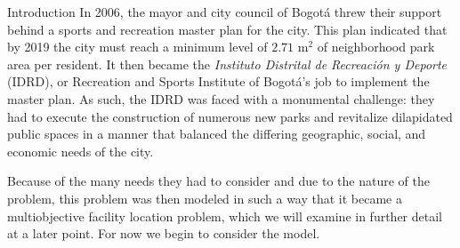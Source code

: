 \documentclass[12pt]{pom_thesis}
\theoremstyle{definition}
\begin{document}
\begin{chapter}{Introduction}
	In 2006, the mayor and city council of Bogot\'{a} threw their support behind a sports and recreation master plan for the city. This plan indicated that by 2019 the city must reach a minimum level of $2.71$  $\textrm{m}^2$ of neighborhood park area per resident. It then became the \textit{Instituto Distrital de Recreaci\'{o}n y Deporte} (IDRD), or Recreation and Sports Institute of Bogot\'{a}'s job to implement the master plan. As such, the IDRD was faced with a monumental challenge: they had to execute the construction of numerous new parks and revitalize dilapidated public spaces in a manner that balanced the differing geographic, social, and economic needs of the city. 
	
	Because of the many needs they had to consider and due to the nature of the problem, this problem was then modeled in such a way that it became a multiobjective facility location problem, which we will examine in further detail at a later point. For now we begin to consider the model.
\end{chapter}
\end{document}
